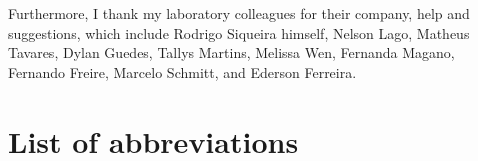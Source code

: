 Furthermore, I thank my laboratory colleagues for their company, help and
suggestions, which include Rodrigo Siqueira himself, Nelson Lago, Matheus
Tavares, Dylan Guedes, Tallys Martins, Melissa Wen, Fernanda Magano, Fernando
Freire, Marcelo Schmitt, and Ederson Ferreira.

\printResumoAbstract



\makeatletter
\if@openright\cleardoublepage\else\clearpage\fi
\makeatother


\newcommand\disablenewpage[1]{{\let\clearpage\par\let\cleardoublepage\par #1}}

\bgroup
\raggedbottom


\disablenewpage{\chapter*{List of abbreviations}}

